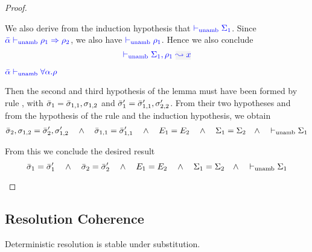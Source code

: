 \begin{proof}
\begin{description}
  We also derive from the induction hypothesis that ${\color{blue}  \vdash_{\mathrm{unamb}} \Sigma_1}$. 
  Since ${\color{blue} \bar{\alpha} \vdash_{\mathrm{unamb}} \rho_1 \Rightarrow \rho_2}$, we also have ${\color{blue}  \vdash_{\mathrm{unamb}} \rho_1}$.
  Hence we also conclude
\begin{equation*}
  \unambig{}{\Sigma_1,\ie{\rulet_1}{x}}
\end{equation*}


\item[\fbox{\rref{UA-TAbs}}]\quad${\color{blue} \bar{\alpha} \vdash_{\mathrm{unamb}} \forall \alpha.\rho}$

Then the second and third hypothesis of the lemma must have been formed by rule ,
  with $\bar{\sigma}_1 = \bar{\sigma}_{1,1},\sigma_{1,2}$ and $\bar{\sigma}_1' = \bar{\sigma}_{1,1}',\sigma_{2,2}'$.
  From their two hypotheses and from the hypothesis of the rule and the induction hypothesis, we obtain
\begin{equation*}
  \bar{\sigma}_2,\sigma_{1,2} = \bar{\sigma}_2',\sigma_{1,2}' 
  \quad\wedge\quad 
  \bar{\sigma}_{1,1} = \bar{\sigma}_{1,1}'
  \quad\wedge\quad 
  E_1 = E_2
  \quad\wedge\quad 
  \Sigma_1 = \Sigma_2
  \quad\wedge\quad 
  \vdash_{\mathrm{unamb}} \Sigma_1
\end{equation*}
  
  From this we conclude the desired result 
\begin{equation*}
  \bar{\sigma}_1 = \bar{\sigma}_1' \quad\wedge\quad \bar{\sigma}_2 = \bar{\sigma}_2'
  \quad\wedge\quad 
  E_1 = E_2
  \quad\wedge\quad 
  \Sigma_1 = \Sigma_2
  \quad\wedge\quad 
  \vdash_{\mathrm{unamb}} \Sigma_1
\end{equation*}
\end{description}
\end{proof}

\subsection{Resolution Coherence}\label{proof:coherence}

Deterministic resolution is stable under substitution.

